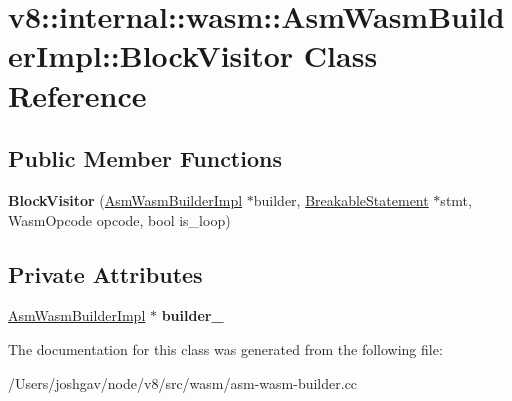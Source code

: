\hypertarget{classv8_1_1internal_1_1wasm_1_1_asm_wasm_builder_impl_1_1_block_visitor}{}\section{v8\+:\+:internal\+:\+:wasm\+:\+:Asm\+Wasm\+Builder\+Impl\+:\+:Block\+Visitor Class Reference}
\label{classv8_1_1internal_1_1wasm_1_1_asm_wasm_builder_impl_1_1_block_visitor}
\subsection*{Public Member Functions}
\begin{DoxyCompactItemize}
\item 
{\bfseries Block\+Visitor} (\hyperlink{classv8_1_1internal_1_1wasm_1_1_asm_wasm_builder_impl}{Asm\+Wasm\+Builder\+Impl} $\ast$builder, \hyperlink{classv8_1_1internal_1_1_breakable_statement}{Breakable\+Statement} $\ast$stmt, Wasm\+Opcode opcode, bool is\+\_\+loop)\hypertarget{classv8_1_1internal_1_1wasm_1_1_asm_wasm_builder_impl_1_1_block_visitor_ae0b124d362dbfb22d5c6106e584cbdb7}{}\label{classv8_1_1internal_1_1wasm_1_1_asm_wasm_builder_impl_1_1_block_visitor_ae0b124d362dbfb22d5c6106e584cbdb7}

\end{DoxyCompactItemize}
\subsection*{Private Attributes}
\begin{DoxyCompactItemize}
\item 
\hyperlink{classv8_1_1internal_1_1wasm_1_1_asm_wasm_builder_impl}{Asm\+Wasm\+Builder\+Impl} $\ast$ {\bfseries builder\+\_\+}\hypertarget{classv8_1_1internal_1_1wasm_1_1_asm_wasm_builder_impl_1_1_block_visitor_a899f31e25add174d76d1003f4855de5a}{}\label{classv8_1_1internal_1_1wasm_1_1_asm_wasm_builder_impl_1_1_block_visitor_a899f31e25add174d76d1003f4855de5a}

\end{DoxyCompactItemize}


The documentation for this class was generated from the following file\+:\begin{DoxyCompactItemize}
\item 
/\+Users/joshgav/node/v8/src/wasm/asm-\/wasm-\/builder.\+cc\end{DoxyCompactItemize}
